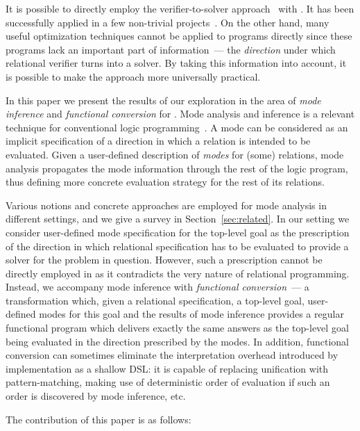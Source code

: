 It is possible to directly employ the verifier-to-solver approach~\cite{byrd2017unified,kosarev2020relational} with \mk.
It has been successfully applied in a few non-trivial projects~\cite{kosarev2022declarative,lozov2023relational}.
On the other hand, many useful optimization techniques cannot be applied to \mk programs directly since these programs lack an important part of information~--- the \emph{direction} under which relational verifier turns into a solver.
By taking this information into account, it is possible to make the approach more universally practical.

In this paper we present the results of our exploration in the area of \emph{mode inference} and \emph{functional conversion} for \mk.
Mode analysis and inference is a relevant technique for conventional logic programming~\cite{debray1988automatic,somogyi1987system,overton2002constraint}.
A mode can be considered as an implicit specification of a direction in which a relation is intended to be evaluated.
Given a user-defined description of \emph{modes} for (some) relations, mode analysis propagates the mode information through the rest of the logic program, thus defining more concrete evaluation strategy for the rest of its relations.

Various notions and concrete approaches are employed for mode analysis in different settings, and we give a survey in Section~\ref{sec:related}.
In our setting we consider user-defined mode specification for the top-level goal as the prescription of the direction in which relational specification has to be evaluated to provide a solver for the problem in question.
However, such a prescription cannot be directly employed in \mk as it contradicts the very nature of relational programming.
Instead, we accompany mode inference with \emph{functional conversion}~--- a transformation which, given a relational specification, a top-level goal, user-defined modes for this goal and the results of mode inference provides a regular functional program which delivers exactly the same answers as the top-level goal being evaluated in the direction prescribed by the modes.
In addition, functional conversion can sometimes eliminate the interpretation overhead introduced by \mk implementation as a shallow DSL: it is capable of replacing unification with pattern-matching, making use of deterministic order of evaluation if such an order is discovered by mode inference, etc.


The contribution of this paper is as follows:

